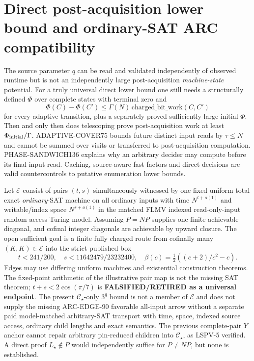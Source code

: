 \documentclass[11pt]{article}
\newcommand{\CS}{\mathcal C_{\star}}
\begin{document}
\section{Direct post-acquisition lower bound and ordinary-SAT ARC compatibility}
The source parameter $q$ can be read and validated independently of observed runtime but is not an independently large post-acquisition \emph{machine-state} potential. For a truly universal direct lower bound one still needs a structurally defined $\Phi$ over complete states with terminal zero and
\[
\Phi(C)-\Phi(C')\le\Gamma(N)\,\mathrm{charged\_bit\_work}(C,C')
\]
for every adaptive transition, plus a separately proved sufficiently large initial $\Phi$. Then and only then does telescoping prove post-acquisition work at least $\Phi_{\rm initial}/\Gamma$. ADAPTIVE-COVER75 bounds future distinct input reads by $\tau\le N$ and cannot be summed over visits or transferred to post-acquisition computation. PHASE-SANDWICH136 explains why an arbitrary decider may compute before its final input read. Caching, source-aware fast factors and direct decisions are valid countercontrols to putative enumeration lower bounds.

Let $\mathcal E$ consist of pairs $(t,s)$ simultaneously witnessed by one fixed uniform total exact \emph{ordinary}-SAT machine on all ordinary inputs with time $N^{t+o(1)}$ and writable/index space $N^{s+o(1)}$ in the matched FLMV indexed read-only-input random-access Turing model. Assuming $P=NP$ supplies one finite achievable diagonal, and cofinal integer diagonals are achievable by upward closure. The open sufficient goal is a finite fully charged route from cofinally many $(K,K)\in\mathcal E$ into the strict published box
\[
t<241/200,\quad
s<11642479/23232400,\quad
\beta(c)=\tfrac12((c+2)/c^2-c).
\]
Edges may use differing uniform machines and existential construction theorems. The fixed-point arithmetic of the illustrative pair map is not the missing SAT theorem; $t+s<2\cos(\pi/7)$ is \textbf{FALSIFIED/RETIRED as a universal endpoint}. The present $\CS$-only $3^q$ bound is not a member of $\mathcal E$ and does not supply the missing ARC-EDGE-90 favorable all-input arrow without a separate paid model-matched arbitrary-SAT transport with time, space, indexed source access, ordinary child lengths and exact semantics. The previous complete-pair $Y$ anchor cannot repair arbitrary pin-reduced children into $\CS$, as LSPV-5 verified. A direct proof $L_\star\notin P$ would independently suffice for $P\ne NP$, but none is established.
\end{document}
